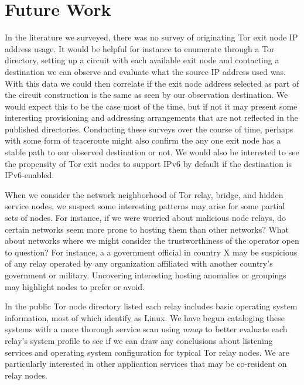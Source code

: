 \documentclass[sigconf]{acmart}
\begin{document}
\section{Future Work}

In the literature we surveyed, there was no survey of originating Tor
exit node IP address usage.  It would be helpful for instance to
enumerate through a Tor directory, setting up a circuit with each
available exit node and contacting a destination we can observe and
evaluate what the source IP address used was.  With this data we could
then correlate if the exit node address selected as part of the circuit
construction is the same as seen by our observation destination.  We
would expect this to be the case most of the time, but if not it may
present some interesting provisioning and addressing arrangements that
are not reflected in the published directories.  Conducting these
surveys over the course of time, perhaps with some form of traceroute
might also confirm the any one exit node has a stable path to our
observed destination or not.  We would also be interested to see the
propensity of Tor exit nodes to support IPv6 by default if the
destination is IPv6-enabled.

When we consider the network neighborhood of Tor relay, bridge, and
hidden service nodes, we suspect some interesting patterns may arise for
some partial sets of nodes.  For instance, if we were worried about
malicious node relays, do certain networks seem more prone to hosting
them than other networks?  What about networks where we might consider
the trustworthiness of the operator open to question?  For instance, a
a government official in country X may be suspicious of any relay
operated by any organization affiliated with another country's
government or military.  Uncovering interesting hosting anomalies or
groupings may highlight nodes to prefer or avoid.

In the public Tor node directory listed each relay includes basic
operating system information, most of which identify as Linux.  We have
begun cataloging these systems with a more thorough service scan using
\emph{nmap} to better evaluate each relay's system profile to see if we
can draw any conclusions about listening services and operating system
configuration for typical Tor relay nodes.  We are particularly
interested in other application services that may be co-resident on
relay nodes.
\end{document}
